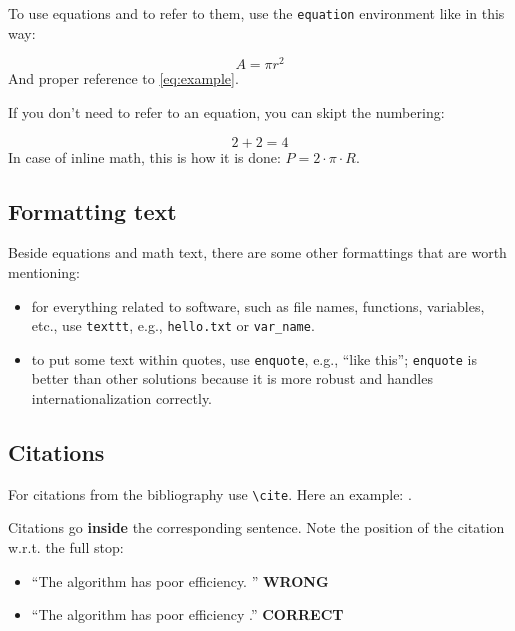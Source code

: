 To use equations and to refer to them, use the \texttt{equation} environment like in this way:

\begin{equation}
\label{eq:example}
A = \pi r^2
\end{equation}
%
And proper reference to \cref{eq:example}.

If you don't need to refer to an equation, you can skipt the numbering:

\[
2 + 2 = 4
\]
%
In case of inline math, this is how it is done: $P = 2 \cdot \pi \cdot R$.

\subsection{Formatting text}

Beside equations and math text, there are some other formattings that are worth mentioning:

\begin{itemize}
\item for everything related to software, such as file names, functions, variables, etc., use \texttt{texttt}, e.g., \texttt{hello.txt} or \texttt{var\_name}.
\item to put some text within quotes, use \texttt{enquote}, e.g., \enquote{like this}; \texttt{enquote} is better than other solutions because it is more robust and handles internationalization correctly.
\end{itemize}

\subsection{Citations}

For citations from the bibliography use \texttt{\textbackslash cite}.
Here an example: \cite{example-citation}.

Citations go \textbf{inside} the corresponding sentence.
Note the position of the citation w.r.t. the full stop:

\begin{itemize}
\item \enquote{The algorithm has poor efficiency. \cite{example-citation}} \textbf{WRONG}
\item \enquote{The algorithm has poor efficiency \cite{example-citation}.} \textbf{CORRECT}
\end{itemize}

